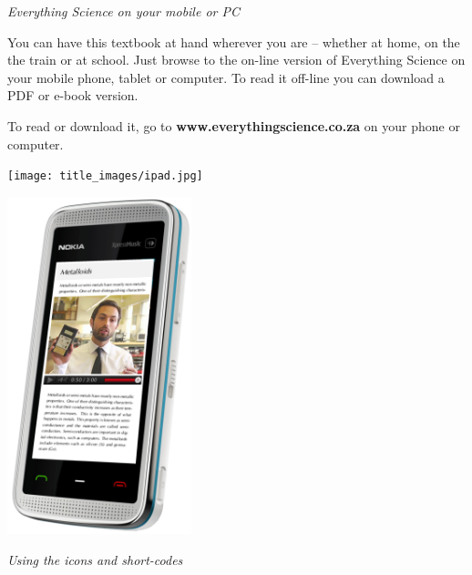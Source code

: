 \newpage
\thispagestyle{empty}

{\normalfont\sffamily\fontsize{22}\normalfont\itshape Everything Science on your mobile or PC} \par

{\Large
You can have this textbook at hand wherever you are – whether at home, on the the train or at school.
Just browse to the on-line version of Everything Science on your mobile phone, tablet or computer. To
read it off-line you can download a PDF or e-book version.\par


To read or download it, go to \textbf{www.everythingscience.co.za} on your phone or computer.} \vspace*{2cm}


\begin{center}
\begin{minipage}{0.4\textwidth}
\centering
\texttt{[image: title\_images/ipad.jpg]}
\end{minipage}
\begin{minipage}{0.4\textwidth}
\centering
\includegraphics[width=0.4\textwidth]{title_images/phone.png}
\end{minipage}
\end{center}

\vspace*{2cm}


{\normalfont\sffamily\fontsize{22}\normalfont\itshape Using the icons and short-codes} \par

